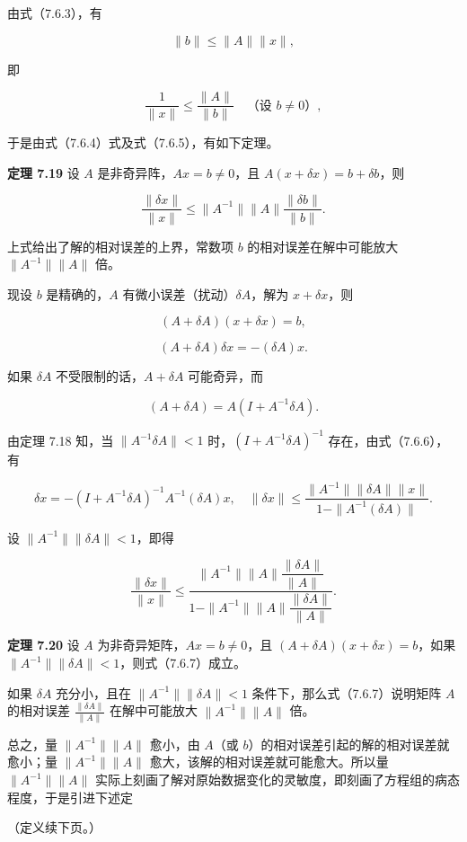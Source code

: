 \documentclass[
  10pt,
  fontset=fandol]{ctexart}
\begin{document}
由式（7.6.3），有

\[
\|b\|\leqslant\|A\|\|x\|,
\]

即

\[
\frac1{\|x\|}\leqslant\frac{\|A\|}{\|b\|}\quad\text{（设 }b\neq0\text{）},
\tag{7.6.5}
\]

于是由式（7.6.4）式及式（7.6.5），有如下定理。

\textbf{定理 7.19} 设 \(A\) 是非奇异阵，\(Ax=b\neq0\)，且 \(A(x+\delta x)=b+\delta b\)，则

\[
\frac{\|\delta x\|}{\|x\|}\leqslant\|A^{-1}\|\|A\|\frac{\|\delta b\|}{\|b\|}.
\]

上式给出了解的相对误差的上界，常数项 \(b\) 的相对误差在解中可能放大 \(\|A^{-1}\|\|A\|\) 倍。

现设 \(b\) 是精确的，\(A\) 有微小误差（扰动）\(\delta A\)，解为 \(x+\delta x\)，则

\[
(A+\delta A)(x+\delta x)=b,
\]

\[
(A+\delta A)\delta x=-(\delta A)x.
\tag{7.6.6}
\]

如果 \(\delta A\) 不受限制的话，\(A+\delta A\) 可能奇异，而

\[
(A+\delta A)=A(I+A^{-1}\delta A).
\]

由定理 7.18 知，当 \(\|A^{-1}\delta A\|<1\) 时，\((I+A^{-1}\delta A)^{-1}\) 存在，由式（7.6.6），有

\[
\delta x=-(I+A^{-1}\delta A)^{-1}A^{-1}(\delta A)x,\quad
\|\delta x\|\leqslant\frac{\|A^{-1}\|\|\delta A\|\|x\|}{1-\|A^{-1}(\delta A)\|}.
\]

设 \(\|A^{-1}\|\|\delta A\|<1\)，即得

\[
\frac{\|\delta x\|}{\|x\|}
\leqslant
\frac{\|A^{-1}\|\|A\|\dfrac{\|\delta A\|}{\|A\|}}
{1-\|A^{-1}\|\|A\|\dfrac{\|\delta A\|}{\|A\|}}.
\tag{7.6.7}
\]

\textbf{定理 7.20} 设 \(A\) 为非奇异矩阵，\(Ax=b\neq0\)，且 \((A+\delta A)(x+\delta x)=b\)，如果 \(\|A^{-1}\|\|\delta A\|<1\)，则式（7.6.7）成立。

如果 \(\delta A\) 充分小，且在 \(\|A^{-1}\|\|\delta A\|<1\) 条件下，那么式（7.6.7）说明矩阵 \(A\) 的相对误差 \(\frac{\|\delta A\|}{\|A\|}\) 在解中可能放大 \(\|A^{-1}\|\|A\|\) 倍。

总之，量 \(\|A^{-1}\|\|A\|\) 愈小，由 \(A\)（或 \(b\)）的相对误差引起的解的相对误差就愈小；量 \(\|A^{-1}\|\|A\|\) 愈大，该解的相对误差就可能愈大。所以量 \(\|A^{-1}\|\|A\|\) 实际上刻画了解对原始数据变化的灵敏度，即刻画了方程组的病态程度，于是引进下述定

（定义续下页。）
\end{document}
